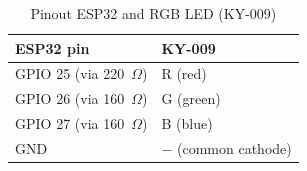 \begin{table}[H]
	\centering
	\begin{tabular}{|l|l|}
		\hline
		ESP32 pin & KY-009 \\
		\hline
		GPIO 25 (via 220~$\Omega$) & R (red) \\
		GPIO 26 (via 160~$\Omega$) & G (green) \\
		GPIO 27 (via 160~$\Omega$) & B (blue) \\
		GND & $-$ (common cathode) \\
		\hline
	\end{tabular}
	\caption{Pinout ESP32 and RGB LED (KY-009)}
	\label{tab:pinout-led}
\end{table}